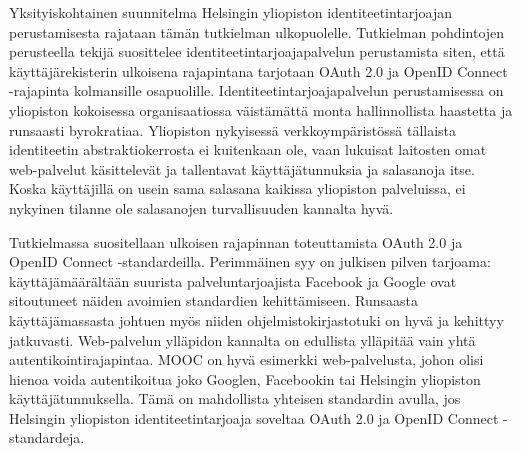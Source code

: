 \documentclass[finnish,gradu]{tktltiki}
\begin{document}
  Yksityiskohtainen suunnitelma Helsingin yliopiston identiteetintarjoajan perustamisesta rajataan tämän tutkielman ulkopuolelle. Tutkielman pohdintojen perusteella tekijä suosittelee identiteetintarjoajapalvelun perustamista siten, että käyttäjärekisterin ulkoisena rajapintana tarjotaan OAuth 2.0 ja OpenID Connect -rajapinta kolmansille osapuolille. Identiteetintarjoajapalvelun perustamisessa on yliopiston kokoisessa organisaatiossa väistämättä monta hallinnollista haastetta ja runsaasti byrokratiaa. Yliopiston nykyisessä verkkoympäristössä tällaista identiteetin abstraktiokerrosta ei kuitenkaan ole, vaan lukuisat laitosten omat web-palvelut käsittelevät ja tallentavat käyttäjätunnuksia ja salasanoja itse. Koska käyttäjillä on usein sama salasana kaikissa yliopiston palveluissa, ei nykyinen tilanne ole salasanojen turvallisuuden kannalta hyvä.

  Tutkielmassa suositellaan ulkoisen rajapinnan toteuttamista OAuth 2.0 ja OpenID Connect -standardeilla. Perimmäinen syy on julkisen pilven tarjoama: käyttäjämäärältään suurista palveluntarjoajista Facebook ja Google ovat sitoutuneet näiden avoimien standardien kehittämiseen. Runsaasta käyttäjämassasta johtuen myös niiden ohjelmistokirjastotuki on hyvä ja kehittyy jatkuvasti. Web-palvelun ylläpidon kannalta on edullista ylläpitää vain yhtä autentikointirajapintaa. MOOC on hyvä esimerkki web-palvelusta, johon olisi hienoa voida autentikoitua joko Googlen, Facebookin tai Helsingin yliopiston käyttäjätunnuksella. Tämä on mahdollista yhteisen standardin avulla, jos Helsingin yliopiston identiteetintarjoaja soveltaa OAuth 2.0 ja OpenID Connect -standardeja.


\end{document}
